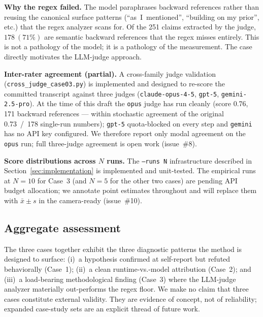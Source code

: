 \textbf{Why the regex failed.} The model paraphrases backward
references rather than reusing the canonical surface patterns
(``as~I~mentioned'', ``building on my prior'', etc.) that the regex
analyzer scans for. Of the 251 claims extracted by the judge,
$178~(71\%)$ are semantic backward references that the regex misses
entirely. This is not a pathology of the model; it is a pathology of
the measurement. The case directly motivates the LLM-judge approach.

\textbf{Inter-rater agreement (partial).} A cross-family judge
validation (\texttt{cross\_judge\_case03.py}) is implemented and
designed to re-score the committed transcript against three judges
(\texttt{claude-opus-4-5}, \texttt{gpt-5}, \texttt{gemini-2.5-pro}).
At the time of this draft the \texttt{opus} judge has run cleanly
(score 0.76, 171 backward references --- within stochastic agreement
of the original 0.73~/~178 single-run numbers); \texttt{gpt-5}
quota-blocked on every step and \texttt{gemini} has no API key
configured. We therefore report only modal agreement on the
\texttt{opus} run; full three-judge agreement is open work
(issue~\#8).

\textbf{Score distributions across $N$ runs.} The \texttt{--runs N}
infrastructure described in Section~\ref{sec:implementation} is
implemented and unit-tested. The empirical runs at $N=10$ for Case~3
(and $N=5$ for the other two cases) are pending API budget
allocation; we annotate point estimates throughout and will replace
them with $\bar{x}\pm s$ in the camera-ready (issue~\#10).

\subsection{Aggregate assessment}

The three cases together exhibit the three diagnostic patterns the
method is designed to surface: (i)~a hypothesis confirmed at
self-report but refuted behaviorally (Case~1); (ii)~a clean
runtime-vs.-model attribution (Case~2); and (iii)~a load-bearing
methodological finding (Case~3) where the LLM-judge analyzer
materially out-performs the regex floor. We make no claim that three
cases constitute external validity. They are evidence of concept, not
of reliability; expanded case-study sets are an explicit thread of
future work.

